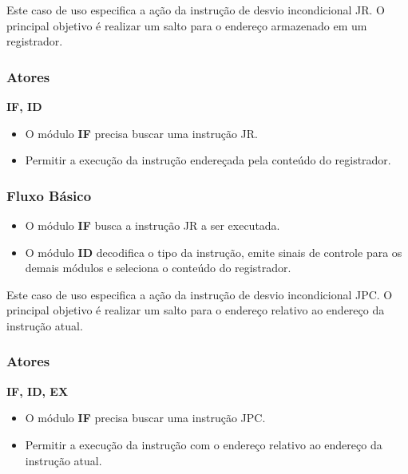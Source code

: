 
Este caso de uso especifica a ação da instrução de desvio incondicional JR. O principal objetivo é realizar um salto para o endereço armazenado em um registrador.
 
\subsubsection*{Atores}
\textbf{IF, ID}

\preconditions 
\begin{itemize}
 \item O módulo \textbf{IF} precisa buscar uma instrução JR.
\end{itemize}

\postconditions
\begin{itemize}
  \item Permitir a execução da instrução endereçada pela conteúdo do registrador.
\end{itemize}

\subsubsection*{Fluxo Básico}
\begin{itemize}
\item O módulo \textbf{IF} busca a instrução JR a ser executada.
\item O módulo \textbf{ID} decodifica o tipo da instrução, emite sinais de controle para os demais módulos e seleciona o conteúdo do registrador. 
\end{itemize}


Este caso de uso especifica a ação da instrução de desvio incondicional JPC. O principal objetivo é realizar um salto para o endereço relativo ao endereço da instrução atual.
 
\subsubsection*{Atores}
\textbf{IF, ID, EX}

\preconditions 
\begin{itemize}
 \item O módulo \textbf{IF} precisa buscar uma instrução JPC.
\end{itemize}

\postconditions
\begin{itemize}
  \item Permitir a execução da instrução com o endereço relativo ao endereço da instrução atual.
\end{itemize}

